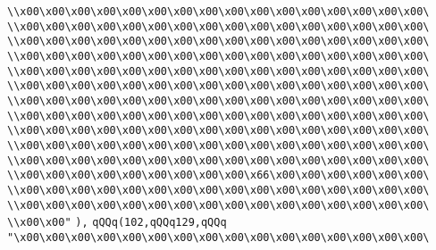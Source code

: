\verb|\\x00\x00\x00\x00\x00\x00\x00\x00\x00\x00\x00\x00\x00\x00\x00\x00\|\newline
\verb|\\x00\x00\x00\x00\x00\x00\x00\x00\x00\x00\x00\x00\x00\x00\x00\x00\|\newline
\verb|\\x00\x00\x00\x00\x00\x00\x00\x00\x00\x00\x00\x00\x00\x00\x00\x00\|\newline
\verb|\\x00\x00\x00\x00\x00\x00\x00\x00\x00\x00\x00\x00\x00\x00\x00\x00\|\newline
\verb|\\x00\x00\x00\x00\x00\x00\x00\x00\x00\x00\x00\x00\x00\x00\x00\x00\|\newline
\verb|\\x00\x00\x00\x00\x00\x00\x00\x00\x00\x00\x00\x00\x00\x00\x00\x00\|\newline
\verb|\\x00\x00\x00\x00\x00\x00\x00\x00\x00\x00\x00\x00\x00\x00\x00\x00\|\newline
\verb|\\x00\x00\x00\x00\x00\x00\x00\x00\x00\x00\x00\x00\x00\x00\x00\x00\|\newline
\verb|\\x00\x00\x00\x00\x00\x00\x00\x00\x00\x00\x00\x00\x00\x00\x00\x00\|\newline
\verb|\\x00\x00\x00\x00\x00\x00\x00\x00\x00\x00\x00\x00\x00\x00\x00\x00\|\newline
\verb|\\x00\x00\x00\x00\x00\x00\x00\x00\x00\x00\x00\x00\x00\x00\x00\x00\|\newline
\verb|\\x00\x00\x00\x00\x00\x00\x00\x00\x00\x66\x00\x00\x00\x00\x00\x00\|\newline
\verb|\\x00\x00\x00\x00\x00\x00\x00\x00\x00\x00\x00\x00\x00\x00\x00\x00\|\newline
\verb|\\x00\x00\x00\x00\x00\x00\x00\x00\x00\x00\x00\x00\x00\x00\x00\x00\|\newline
\verb|\\x00\x00"|\newline
\verb|),|\newline
\verb|qQQq(102,qQQq129,qQQq|\newline
\verb|"\x00\x00\x00\x00\x00\x00\x00\x00\x00\x00\x00\x00\x00\x00\x00\x00\|\newline
